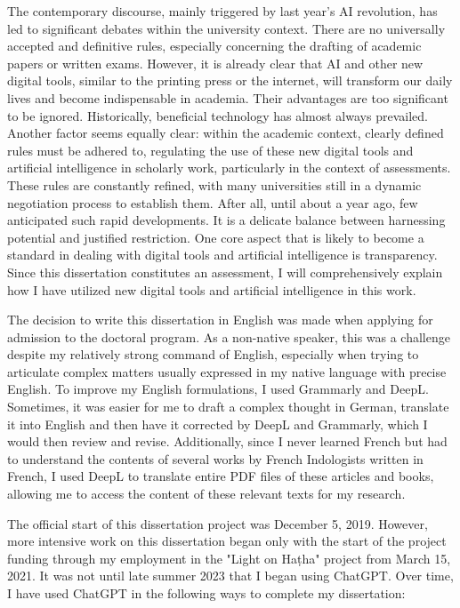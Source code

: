 The contemporary discourse, mainly triggered by last year's AI revolution, has led to significant debates within the university context. There are no universally accepted and definitive rules, especially concerning the drafting of academic papers or written exams. However, it is already clear that AI and other new digital tools, similar to the printing press or the internet, will transform our daily lives and become indispensable in academia. Their advantages are too significant to be ignored. Historically, beneficial technology has almost always prevailed. Another factor seems equally clear: within the academic context, clearly defined rules must be adhered to, regulating the use of these new digital tools and artificial intelligence in scholarly work, particularly in the context of assessments. These rules are constantly refined, with many universities still in a dynamic negotiation process to establish them. After all, until about a year ago, few anticipated such rapid developments. It is a delicate balance between harnessing potential and justified restriction. One core aspect that is likely to become a standard in dealing with digital tools and artificial intelligence is transparency. Since this dissertation constitutes an assessment, I will comprehensively explain how I have utilized new digital tools and artificial intelligence in this work.

The decision to write this dissertation in English was made when applying for admission to the doctoral program. As a non-native speaker, this was a challenge despite my relatively strong command of English, especially when trying to articulate complex matters usually expressed in my native language with precise English. To improve my English formulations, I used Grammarly and DeepL. Sometimes, it was easier for me to draft a complex thought in German, translate it into English and then have it corrected by DeepL and Grammarly, which I would then review and revise. Additionally, since I never learned French but had to understand the contents of several works by French Indologists written in French, I used DeepL to translate entire PDF files of these articles and books, allowing me to access the content of these relevant texts for my research.

The official start of this dissertation project was December 5, 2019. However, more intensive work on this dissertation began only with the start of the project funding through my employment in the "Light on Haṭha" project from March 15, 2021. It was not until late summer 2023 that I began using ChatGPT. Over time, I have used ChatGPT in the following ways to complete my dissertation:

